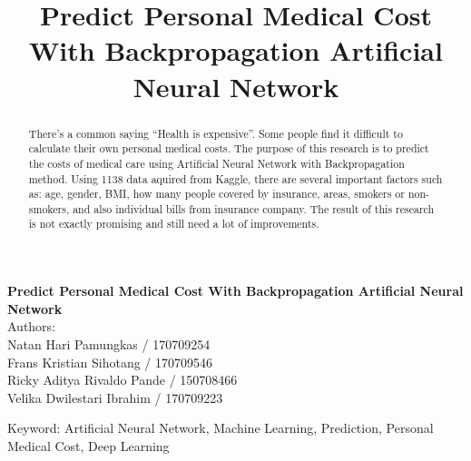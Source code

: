 \documentclass[a4paper, 12pt]{article}
\title{Predict Personal Medical Cost With Backpropagation Artificial Neural Network}
\date{}
\begin{document}
\centering
\textbf{\Large Predict Personal Medical Cost With Backpropagation Artificial Neural Network}\\
\vspace{0.5cm}
\small Authors:\\
\scriptsize Natan Hari Pamungkas / 170709254\\
\scriptsize Frans Kristian Sihotang / 170709546\\
\scriptsize Ricky Aditya Rivaldo Pande / 150708466\\
\scriptsize Velika Dwilestari Ibrahim / 170709223\\

\begin{abstract}
There’s a common saying “Health is expensive”. Some people find it difficult to calculate their own personal medical costs. The purpose of this research is to predict the costs of medical care using Artificial Neural Network with Backpropagation method. Using 1138 data aquired from Kaggle, there are several important factors such as: age, gender, BMI, how many people covered by insurance, areas, smokers or non-smokers, and also individual bills from insurance company. The result of this research
is not exactly promising and still need a lot of improvements.\\
\end{abstract}

\scriptsize Keyword: Artificial Neural Network,  Machine Learning, Prediction, Personal Medical Cost, Deep Learning
\end{document}
